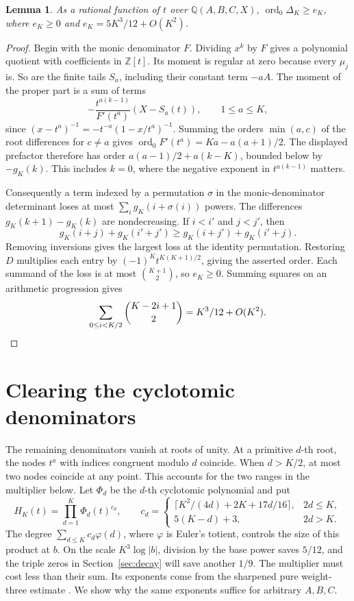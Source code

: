 \documentclass[11pt]{article}
\newtheorem{lemma}[theorem]{Lemma}
\newcommand{\Q}{\mathbb Q}
\newcommand{\Z}{\mathbb Z}
\newcommand{\Ord}{\operatorname{ord}}
\begin{document}
\begin{lemma}\label{lem:base}
As a rational function of \(t\) over \(\Q(A,B,C,X)\),
\(\Ord_0\Delta_K\ge e_K\), where \(e_K\ge0\) and
\(e_K=5K^3/12+O(K^2)\).
\end{lemma}
\begin{proof}
Begin with the monic denominator \(F\). Dividing \(x^k\) by \(F\)
gives a polynomial quotient with coefficients in \(\Z[t]\). Its
moment is regular at zero because every \(\mu_j\) is. So are the
finite tails \(S_a\), including their constant term \(-aA\).
The moment of the proper part is a sum of terms
\[
              -\frac{t^{a(k-1)}}{F'(t^a)}(X-S_a(t)),\qquad 1\le a\le K ,
\]
since \((x-t^a)^{-1}=-t^{-a}(1-x/t^a)^{-1}\).
Summing the orders \(\min(a,c)\) of the root differences
for \(c\ne a\) gives \(\Ord_0 F'(t^a)=Ka-a(a+1)/2\).
The displayed prefactor therefore has order
\(a(a-1)/2+a(k-K)\), bounded below by \(-g_K(k)\).
This includes \(k=0\), where the negative exponent in \(t^{a(k-1)}\)
matters.

Consequently a term indexed by a permutation \(\sigma\) in the
monic-denominator determinant loses at most
\(\sum_i g_K(i+\sigma(i))\) powers. The differences
\(g_K(k+1)-g_K(k)\) are nondecreasing. If \(i<i'\) and \(j<j'\), then
\[
 g_K(i+j)+g_K(i'+j')\ge g_K(i+j')+g_K(i'+j).
\]
Removing inversions gives the largest loss at the identity permutation.
Restoring \(D\) multiplies each entry by \((-1)^K t^{K(K+1)/2}\),
giving the asserted order. Each summand of the loss is at most
\(\binom{K+1}{2}\), so \(e_K\ge0\). Summing squares on an arithmetic
progression gives
\[
  \sum_{0\le i<K/2}\binom{K-2i+1}{2}=K^3/12+O(K^2).\qedhere
\]
\end{proof}

\section{Clearing the cyclotomic denominators}

The remaining denominators vanish at roots of unity. At a primitive
\(d\)-th root, the nodes \(t^a\) with indices congruent modulo \(d\)
coincide. When \(d>K/2\), at most two nodes coincide at any point.
This accounts for the two ranges in the multiplier below.
Let \(\Phi_d\) be the \(d\)-th cyclotomic polynomial and put
\begin{equation}\label{eq:clearer}
 H_K(t)=\prod_{d=1}^K\Phi_d(t)^{c_d},\qquad
 c_d=\begin{cases}
 \lceil K^2/(4d)+2K+17d/16\rceil,&2d\le K,\\
 5(K-d)+3,&2d>K.
 \end{cases}
\end{equation}
The degree \(\sum_{d\le K}c_d\varphi(d)\), where \(\varphi\)
is Euler's totient, controls the size of this product at \(b\).
On the scale \(K^3\log|b|\), division by the base power saves \(5/12\),
and the triple zeros in Section~\ref{sec:decay} will save another
\(1/9\). The multiplier must cost less than their sum. Its exponents
come from the sharpened pure weight-three estimate
\cite[\S4 and Appendix A]{Uplift}.
We show why the same exponents suffice for arbitrary \(A,B,C\).
\end{document}
